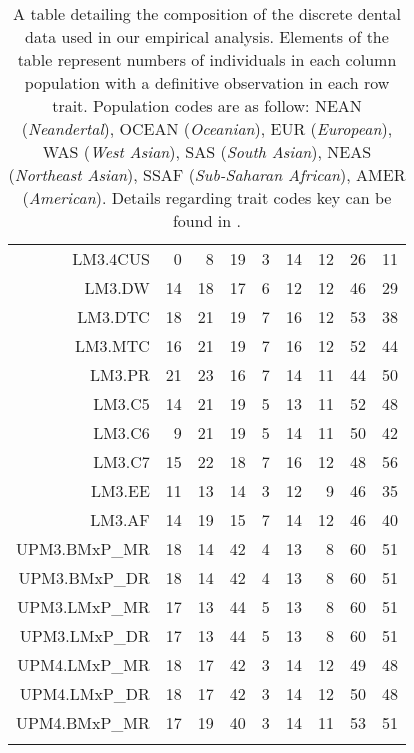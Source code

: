 \begin{longtable}{rrrrrrrrr}
  LM3.4CUS &   0 &   8 &  19 &   3 &  14 &  12 &  26 &  11 \\ 
  LM3.DW &  14 &  18 &  17 &   6 &  12 &  12 &  46 &  29 \\ 
  LM3.DTC &  18 &  21 &  19 &   7 &  16 &  12 &  53 &  38 \\ 
  LM3.MTC &  16 &  21 &  19 &   7 &  16 &  12 &  52 &  44 \\ 
  LM3.PR &  21 &  23 &  16 &   7 &  14 &  11 &  44 &  50 \\ 
  LM3.C5 &  14 &  21 &  19 &   5 &  13 &  11 &  52 &  48 \\ 
  LM3.C6 &   9 &  21 &  19 &   5 &  14 &  11 &  50 &  42 \\ 
  LM3.C7 &  15 &  22 &  18 &   7 &  16 &  12 &  48 &  56 \\ 
  LM3.EE &  11 &  13 &  14 &   3 &  12 &   9 &  46 &  35 \\ 
  LM3.AF &  14 &  19 &  15 &   7 &  14 &  12 &  46 &  40 \\ 
  UPM3.BMxP\_MR &  18 &  14 &  42 &   4 &  13 &   8 &  60 &  51 \\ 
  UPM3.BMxP\_DR &  18 &  14 &  42 &   4 &  13 &   8 &  60 &  51 \\ 
  UPM3.LMxP\_MR &  17 &  13 &  44 &   5 &  13 &   8 &  60 &  51 \\ 
  UPM3.LMxP\_DR &  17 &  13 &  44 &   5 &  13 &   8 &  60 &  51 \\ 
  UPM4.LMxP\_MR &  18 &  17 &  42 &   3 &  14 &  12 &  49 &  48 \\ 
  UPM4.LMxP\_DR &  18 &  17 &  42 &   3 &  14 &  12 &  50 &  48 \\ 
  UPM4.BMxP\_MR &  17 &  19 &  40 &   3 &  14 &  11 &  53 &  51 \\ 
   \hline
\hline
\caption[Composition of Dental Data Used in Empirical Analysis]{A table detailing the composition of the discrete dental data used in 
                                     our empirical analysis. Elements of the table represent numbers of individuals in each 
                                     column population with a definitive observation in each 
                                     row trait. Population codes are as follow: NEAN (\textit{Neandertal}), OCEAN (\textit{Oceanian}), EUR (\textit{European}), WAS (\textit{West Asian}), SAS (\textit{South Asian}), NEAS (\textit{Northeast Asian}), SSAF (\textit{Sub-Saharan African}), AMER (\textit{American}). Details regarding trait codes key can be found in \citep{baileyNeandertalDentalMorphology2002}.} 
\label{tab:dentalDataComposition}
\end{longtable}
